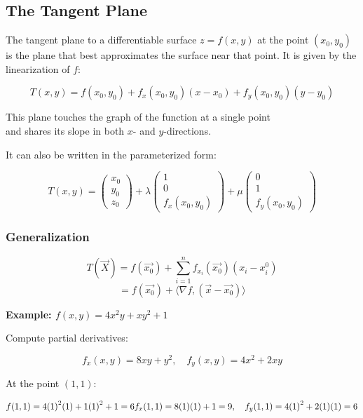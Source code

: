 \subsection{The Tangent Plane}

The tangent plane to a differentiable surface \( z = f(x, y) \) at the point \( (x_0, y_0) \) is the plane that best approximates the surface near that point. It is given by the linearization of \( f \):

\[
    T(x, y) = f(x_0, y_0) + f_x(x_0, y_0)(x - x_0) + f_y(x_0, y_0)(y - y_0)
\]

This plane touches the graph of the function at a single point\\
and shares its slope in both \( x \)- and \( y \)-directions.

It can also be written in the parameterized form:

\[
    T(x,y) = \begin{pmatrix} x_0\\ y_0\\ z_0\end{pmatrix} + \lambda 
    \begin{pmatrix} 1\\ 0 \\ f_x(x_0,y_0)\end{pmatrix} + \mu \begin{pmatrix}
    0 \\ 1 \\ f_y(x_0, y_0)
    \end{pmatrix}
\]

\subsubsection{Generalization}

\[
    T(\vec{X}) = f(\vec{x_0}) + \sum_{i = 1}^{n} f_{x_i}(\vec{x_0})(x_i - x_{i}^0)
\]
\[
    = f(\vec{x_0}) + \langle \nabla f, (\vec{x} - \vec{x_0})\rangle
\]

\textbf{Example: \( f(x, y) = 4x^2y + xy^2 + 1 \)}
\vspace{\baselineskip}

Compute partial derivatives:

\[
    f_x(x, y) = 8xy + y^2, \quad f_y(x, y) = 4x^2 + 2xy
\]

At the point \( (1, 1) \):

\[
    f(1, 1) = 4{(1)}^2(1) + 1{(1)}^2 + 1 = 6 \\
    f_x(1, 1) = 8(1)(1) + 1 = 9, \quad f_y(1, 1) = 4{(1)}^2 + 2(1)(1) = 6
\]

